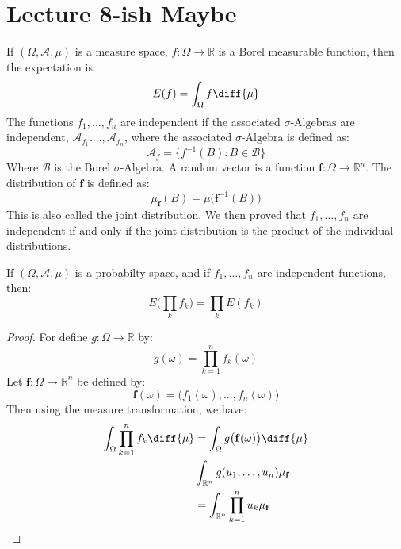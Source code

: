 \section{Lecture 8-ish Maybe}
    If $(\Omega,\mathcal{A},\mu)$ is a measure space,
    $f:\Omega\rightarrow\mathbb{R}$ is a Borel measurable
    function, then the expectation is:
    \begin{equation}
        E(f)=\int_{\Omega}f\diff{\mu}
    \end{equation}
    The functions $f_{1},\dots,f_{n}$ are independent if
    the associated $\sigma\textrm{-Algebras}$ are independent,
    $\mathcal{A}_{f_{1}}.\dots,\mathcal{A}_{f_{n}}$, where
    the associated $\sigma\textrm{-Algebra}$ is defined
    as:
    \begin{equation}
        \mathcal{A}_{f}=\{f^{\minus{1}}(B):B\in\mathcal{B}\}
    \end{equation}
    Where $\mathcal{B}$ is the Borel
    $\sigma\textrm{-Algebra}$. A random vector is a function
    $\mathbf{f}:\Omega\rightarrow\mathbb{R}^{n}$. The
    distribution of $\mathbf{f}$ is defined as:
    \begin{equation}
        \mu_{\mathbf{f}}(B)=
            \mu\big(\mathbf{f}^{\minus{1}}(B)\big)
    \end{equation}
    This is also called the joint distribution. We then proved
    that $f_{1},\dots,f_{n}$ are independent if and only
    if the joint distribution is the product of the
    individual distributions.
    \begin{theorem}
        If $(\Omega,\mathcal{A},\mu)$ is a probabilty space,
        and if $f_{1},\dots,f_{n}$ are independent functions,
        then:
        \begin{equation}
            E\Big(\prod_{k}f_{k}\Big)
            =\prod_{k}E(f_{k})
        \end{equation}
    \end{theorem}
    \begin{proof}
        For define $g:\Omega\rightarrow\mathbb{R}$ by:
        \begin{equation}
            g(\omega)=\prod_{k=1}^{n}f_{k}(\omega)
        \end{equation}
        Let $\mathbf{f}:\Omega\rightarrow\mathbb{R}^{n}$ be
        defined by:
        \begin{equation}
            \mathbf{f}(\omega)=
            \big(f_{1}(\omega),\dots,f_{n}(\omega)\big)
        \end{equation}
        Then using the measure transformation, we have:
        \begin{align}
            \int_{\Omega}\prod_{k=1}^{n}f_{k}\diff{\mu}
            &=\int_{\Omega}g\big(\mathbf{f}(\omega)\big)
                \diff{\mu}\\
            &\int_{\mathbb{R}^{n}}g(u_{1},\dots,u_{n})
                \mu_{\mathbf{f}}\\
            &=\int_{\mathbb{R}^{n}}\prod_{k=1}^{n}u_{k}
                \mu_{\mathbf{f}}
        \end{align}
    \end{proof}
